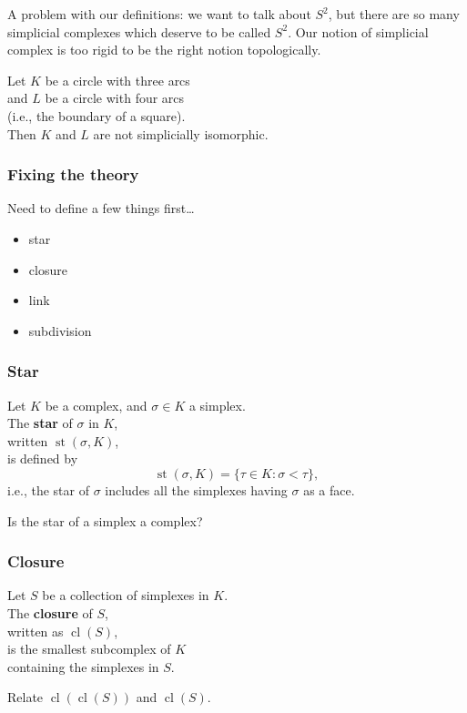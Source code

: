 \documentclass[14pt]{beamer}
\DeclareMathOperator{\st}{st}
\DeclareMathOperator{\cl}{cl}
\begin{document}
\begin{frame}
A problem with our definitions: we want to talk about $S^2$, but there are so many simplicial complexes which deserve to be called $S^2$.
\vfill
Our notion of simplicial complex is too rigid to be the right notion topologically.
\vfill
\begin{example}
  Let $K$ be a circle with three arcs \\
  and $L$ be a circle with four arcs \\
  \quad(i.e., the boundary of a square). \\
  Then $K$ and $L$ are not simplicially isomorphic.
\end{example}

\end{frame}

\begin{frame}
\frametitle{Fixing the theory}

Need to define a few things first\ldots
\begin{itemize}
\item star
\item closure
\item link
\item subdivision
\end{itemize}

\end{frame}

\begin{frame}
\frametitle{Star}

\begin{definition}
Let $K$ be a complex, and $\sigma \in K$ a simplex.\\
The \textbf{star} of $\sigma$ in $K$, \\
\quad written $\st(\sigma,K)$, \\
is defined by
$$
\st(\sigma,K) = \{ \tau \in K : \sigma < \tau \},
$$
i.e., the star of $\sigma$ includes all the simplexes having $\sigma$
as a face.
\end{definition}
\pause
\begin{problem}
Is the star of a simplex a complex?
\end{problem}
\end{frame}

\begin{frame}
\frametitle{Closure}
\begin{definition}
Let $S$ be a collection of simplexes in $K$.  \\
The \textbf{closure} of $S$, \\
\quad written as $\cl(S)$, \\
is the smallest subcomplex of $K$ \\
containing the simplexes in $S$.
\end{definition}
\pause
\begin{problem}
Relate $\cl(\cl(S))$ and $\cl(S)$.
\end{problem}
\end{frame}
\end{document}
